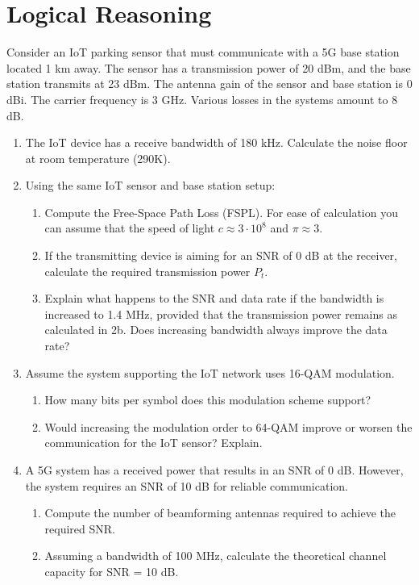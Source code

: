 \documentclass[12pt]{article}
\begin{document}
\section{Logical Reasoning}
Consider an IoT parking sensor that must communicate with a 5G base station located 1 km away.
The sensor has a transmission power of 20 dBm, and the base station transmits at 23 dBm. The antenna gain of the sensor and base station is 0 dBi. The carrier frequency is 3 GHz. Various losses in the systems amount to 8 dB.
\begin{enumerate}
    \item The IoT device has a receive bandwidth of 180 kHz. Calculate the noise floor at room temperature (290K).
    \item Using the same IoT sensor and base station setup:
    \begin{enumerate}
        \item Compute the Free-Space Path Loss (FSPL). For ease of calculation you can assume that the speed of light $c \approx 3\cdot10^8$ and $\pi \approx 3$.
        \item If the transmitting device is aiming for an SNR of 0 dB at the receiver, calculate the required transmission power $P_t$.
        \item Explain what happens to the SNR and data rate if the bandwidth is increased to 1.4 MHz, provided that the transmission power remains as calculated in 2b. Does increasing bandwidth always improve the data rate?
    \end{enumerate}
    \item Assume the system supporting the IoT network uses 16-QAM modulation.
    \begin{enumerate}
        \item How many bits per symbol does this modulation scheme support?
        \item Would increasing the modulation order to 64-QAM improve or worsen the communication for the IoT sensor? Explain.
    \end{enumerate}
\item A 5G system has a received power that results in an SNR of 0 dB. However, the system requires an SNR of 10 dB for reliable communication.
    \begin{enumerate}
        \item Compute the number of beamforming antennas required to achieve the required SNR.
        \item Assuming a bandwidth of 100 MHz, calculate the theoretical channel capacity for SNR = 10 dB.
    \end{enumerate}

    \end{enumerate}
\newpage
\end{document}
